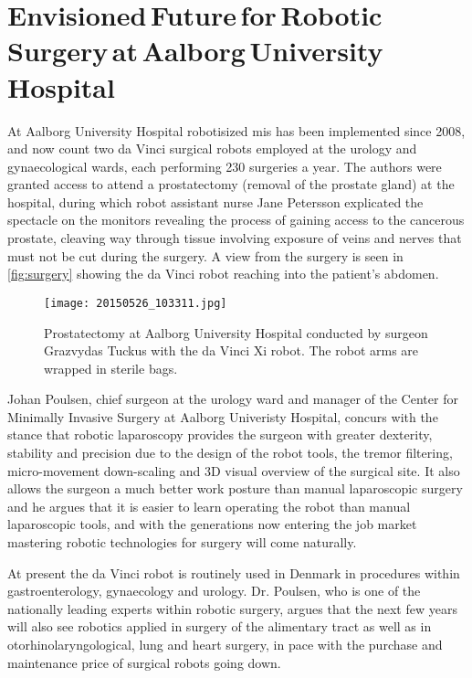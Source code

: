 \vspace{-1mm}
\section[Envisioned Future for Robotic Surgery at Aalborg University Hospital]{Envisioned\,Future\,for\,Robotic\,Surgery\,at\,Aalborg\,University\,Hospital}\label{sec:aau_doc}

\vspace{-2mm}
At Aalborg University Hospital robotisized \gls{mis} has been implemented since 2008, and now count two da Vinci surgical robots employed at the urology and gynaecological wards, each performing 230 surgeries a year. %
The authors were granted access to attend a prostatectomy (removal of the prostate gland) at the hospital, during which robot assistant nurse Jane Petersson explicated the spectacle on the monitors revealing the process of gaining access to the cancerous prostate, cleaving way through tissue involving exposure of veins and nerves that must not be cut during the surgery. A view from the surgery is seen in \autoref{fig:surgery} showing the da Vinci robot reaching into the patient's abdomen.
\begin{figure}[htbp]
	\centering
	\texttt{[image: 20150526\_103311.jpg]}
	\caption{Prostatectomy at Aalborg University Hospital conducted by surgeon Grazvydas Tuckus with the da Vinci Xi robot. The robot arms are wrapped in sterile bags.}
	\label{fig:surgery}
\end{figure}

\phantom{.}

\vspace{-12mm}
Johan Poulsen, chief surgeon at the urology ward and manager of the Center for Minimally Invasive Surgery at Aalborg Univeristy Hospital, concurs with the stance that robotic laparoscopy provides the surgeon with greater dexterity, stability and precision due to the design of the robot tools, the tremor filtering, micro-movement down-scaling %
and 3D visual overview of the surgical site.  %
It also allows the surgeon a much better work posture than manual laparoscopic surgery and he argues that it is easier to learn operating the robot than manual laparoscopic tools, %
and with the generations now entering the job market mastering  robotic technologies for surgery will come naturally.

At present the da Vinci robot is routinely used in Denmark in procedures within gastroenterology, gynaecology and urology. Dr. Poulsen, who is one of the nationally leading experts within robotic surgery, argues that the next few years will also see robotics applied in surgery of the alimentary tract as well as in otorhinolaryngological, lung and heart surgery, in pace with the purchase and maintenance price of surgical robots going down.

